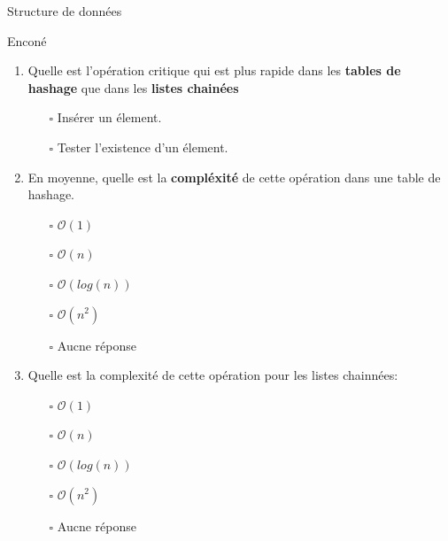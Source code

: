 \documentclass{beamer}
\begin{document}
\begin{frame}[t]{Structure de données}
  
  \begin{block}{Enconé}
    \small
    \begin{enumerate}
    \small
        \item Quelle est l'opération critique qui est plus rapide dans
          les \textbf{tables de hashage} que dans les \textbf{listes chainées}
          \begin{itemize}
            \scriptsize
            \item[$\square$] Insérer un élement.
            \item[$\square$] Tester l'existence d'un élement.
          \end{itemize}
        \item En moyenne, quelle est la \alert{\textbf{compléxité}} de
          cette
        opération dans une table de hashage.
          \begin{itemize}
            \scriptsize
            \item[$\square$] $\mathcal{O}(1)$
            \item[$\square$] $\mathcal{O}(n)$
            \item[$\square$] $\mathcal{O}(log(n))$
            \item[$\square$] $\mathcal{O}(n^2)$
            \item[$\square$] Aucne réponse
          \end{itemize}
      \item Quelle est la complexité de cette opération pour les listes
        chainnées:
          \begin{itemize}
            \scriptsize
            \item[$\square$] $\mathcal{O}(1)$
            \item[$\square$] $\mathcal{O}(n)$
            \item[$\square$] $\mathcal{O}(log(n))$
            \item[$\square$] $\mathcal{O}(n^2)$
            \item[$\square$] Aucne réponse
          \end{itemize}
    \end{enumerate}
  \end{block}
\end{frame}
\end{document}
